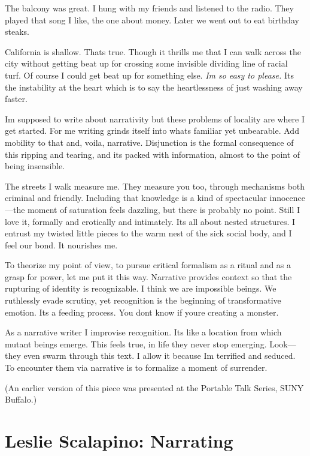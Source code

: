 \documentclass[
]{memoir}
\begin{document}
The balcony was great. I hung with my friends and listened to the radio.
They played that song I like, the one about money. Later we went out to
eat birthday steaks.

California is shallow. Thats true. Though it thrills me that I can walk
across the city without getting beat up for crossing some invisible
dividing line of racial turf. Of course I could get beat up for
something else. \emph{Im so easy to please.} Its the instability at the
heart which is to say the heartlessness of just washing away faster.

Im supposed to write about narrativity but these problems of locality
are where I get started. For me writing grinds itself into whats
familiar yet unbearable. Add mobility to that and, voila, narrative.
Disjunction is the formal consequence of this ripping and tearing, and
its packed with information, almost to the point of being insensible.

The streets I walk measure me. They measure you too, through mechanisms
both criminal and friendly. Including that knowledge is a kind of
spectacular innocence---the moment of saturation feels dazzling, but
there is probably no point. Still I love it, formally and erotically and
intimately. Its all about nested structures. I entrust my twisted little
pieces to the warm nest of the sick social body, and I feel our bond. It
nourishes me.

To theorize my point of view, to pursue critical formalism as a ritual
and as a grasp for power, let me put it this way. Narrative provides
context so that the rupturing of identity is recognizable. I think we
are impossible beings. We ruthlessly evade scrutiny, yet recognition is
the beginning of transformative emotion. Its a feeding process. You dont
know if youre creating a monster.

As a narrative writer I improvise recognition. Its like a location from
which mutant beings emerge. This feels true, in life they never stop
emerging. Look---they even swarm through this text. I allow it because
Im terrified and seduced. To encounter them via narrative is to
formalize a moment of surrender.

(An earlier version of this piece was presented at the Portable Talk
Series, SUNY Buffalo.)

\hypertarget{leslie-scalapino-narrating}{%
\chapter{Leslie Scalapino: Narrating}\label{leslie-scalapino-narrating}}
\end{document}
